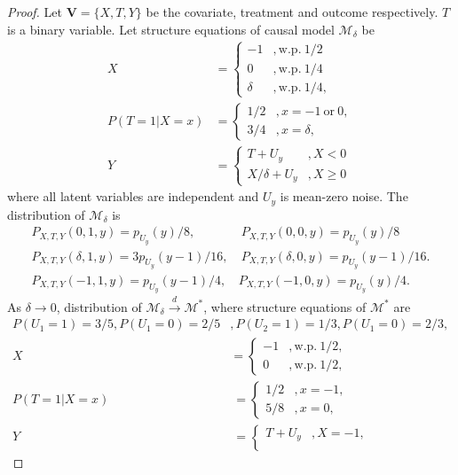 \begin{proof}

Let $ \boldsymbol{V} = \{ X,T,Y\} $ be the covariate, treatment and outcome respectively. $ T$ is a binary variable. Let structure equations of causal model $ \mathcal{M}_{\delta }$ be 
\begin{align*}
X & =\begin{cases}
-1 & ,\text{w.p.} \ 1/2\\
0 & ,\text{w.p.} \ 1/4\\
\delta  & ,\text{w.p.} \ 1/4,
\end{cases}\\
P( T=1|X=x) & =\begin{cases}
1/2 & ,x=-1\ \text{or} \ 0,\\
3/4 & ,x=\delta ,
\end{cases}\\
Y & =\begin{cases}
T+U_{y} & ,X< 0\\
X/\delta +U_{y} & ,X\geqslant 0
\end{cases}
\end{align*}where all latent variables are independent and $ U_{y}$ is mean-zero noise. The distribution of $ \mathcal{M}_{\delta }$ is 
\begin{align*}
P_{X,T,Y}( 0,1,y) =p_{U_{y}}( y) /8, & \ P_{X,T,Y}( 0,0,y) =p_{U_{y}}( y) /8\\
P_{X,T,Y}( \delta ,1,y) =3p_{U_{y}}( y-1) /16, & \ P_{X,T,Y}( \delta ,0,y) =p_{U_{y}}( y-1) /16.\\
P_{X,T,Y}( -1,1,y) =p_{U_{y}}( y-1) /4, & P_{X,T,Y}( -1,0,y) =p_{U_{y}}( y) /4.
\end{align*}
As $ \delta \rightarrow 0$, distribution of $ \mathcal{M}_{\delta }\xrightarrow{d}\mathcal{M}^*$, where structure equations of $ \mathcal{M}^*$ are 
\begin{align*}
P( U_{1} =1) =3/5,P(U_{1} =0) =2/5 & ,P( U_{2} =1) =1/3,P( U_{1} =0) =2/3,\\
X & =\begin{cases}
-1 & ,\text{w.p.} \ 1/2,\\
0 & ,\text{w.p.} \ 1/2,
\end{cases}\\
P( T=1|X=x) & \ =\begin{cases}
1/2 & ,x=-1,\\
5/8 & ,x=0,
\end{cases}\\
Y & \ =\begin{cases}
T+U_{y} & ,X=-1,\\

\end{cases}
\end{align*}
\end{proof}
